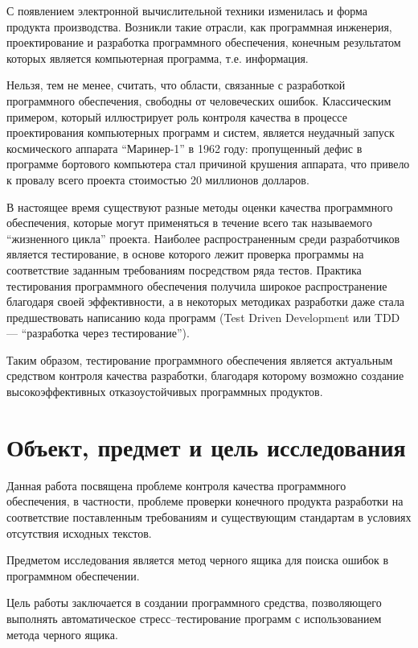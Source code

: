 \documentclass[a4paper,14pt,href]{article}
\begin{document}
  С появлением электронной вычислительной техники изменилась и форма продукта производства. Возникли такие отрасли, как программная инженерия, проектирование и разработка программного обеспечения, конечным результатом которых является компьютерная программа, т.е. информация.

  Нельзя, тем не менее, считать, что области, связанные с разработкой программного обеспечения, свободны от человеческих ошибок. Классическим примером, который иллюстрирует роль контроля качества в процессе проектирования компьютерных программ и систем, является неудачный запуск космического аппарата ``Маринер-1'' в 1962 году: пропущенный дефис в программе бортового компьютера стал причиной крушения аппарата, что привело к провалу всего проекта стоимостью 20 миллионов долларов\cite{Mariner}.

  В настоящее время существуют разные методы оценки качества программного обеспечения, которые могут применяться в течение всего так называемого ``жизненного цикла'' проекта. Наиболее распространенным среди разработчиков является тестирование, в основе которого лежит проверка программы на соответствие заданным требованиям посредством ряда тестов. Практика тестирования программного обеспечения получила широкое распространение благодаря своей эффективности, а в некоторых методиках разработки даже стала предшествовать написанию кода программ (Test Driven Development или TDD --- ``разработка через тестирование''\cite{ExtremeProgramming}).

  Таким образом, тестирование программного обеспечения является актуальным средством контроля качества разработки, благодаря которому возможно создание высокоэффективных отказоустойчивых программных продуктов.

\section*{Объект, предмет и цель исследования}
	Данная работа посвящена проблеме контроля качества программного обеспечения, в частности, проблеме проверки конечного продукта разработки на соответствие поставленным требованиям и существующим стандартам в условиях отсутствия исходных текстов.

	Предметом исследования является метод черного ящика для поиска ошибок в программном обеспечении.

	Цель работы заключается в создании программного средства, позволяющего выполнять автоматическое стресс--тестирование программ с использованием метода черного ящика.
\end{document}
